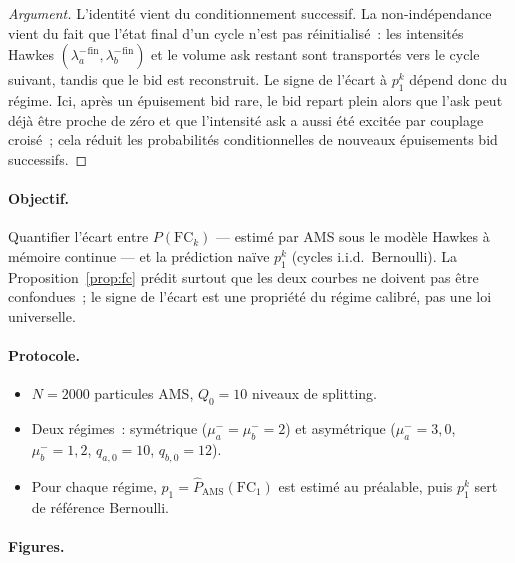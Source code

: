 \documentclass[11pt,a4paper]{article}
\theoremstyle{definition}
\newcommand{\la}{\lambda_a^-}
\newcommand{\lb}{\lambda_b^-}
\begin{document}
\begin{proof}[Argument]
L'identité vient du conditionnement successif. La non-indépendance vient du
fait que l'état final d'un cycle n'est pas réinitialisé~: les intensités
Hawkes $({\la}^\mathrm{fin},{\lb}^\mathrm{fin})$ et le volume ask restant sont
transportés vers le cycle suivant, tandis que le bid est reconstruit. Le signe
de l'écart à $p_1^k$ dépend donc du régime. Ici, après un épuisement bid rare,
le bid repart plein alors que l'ask peut déjà être proche de zéro et que
l'intensité ask a aussi été excitée par couplage croisé~; cela réduit les
probabilités conditionnelles de nouveaux épuisements bid successifs.
\end{proof}

\begin{demonstration}

\paragraph{Objectif.}
Quantifier l'écart entre $P(\mathrm{FC}_k)$ — estimé par AMS sous le modèle
Hawkes à mémoire continue — et la prédiction naïve $p_1^k$ (cycles i.i.d.\
Bernoulli). La Proposition~\ref{prop:fc} prédit surtout que les deux courbes
ne doivent pas être confondues~; le signe de l'écart est une propriété du
régime calibré, pas une loi universelle.

\paragraph{Protocole.}
\begin{itemize}
  \item $N=2000$ particules AMS, $Q_0=10$ niveaux de splitting.
  \item Deux régimes~: symétrique ($\mu_a^-=\mu_b^-=2$) et asymétrique
    ($\mu_a^-=3{,}0$, $\mu_b^-=1{,}2$, $q_{a,0}=10$, $q_{b,0}=12$).
  \item Pour chaque régime, $p_1=\hat P_\mathrm{AMS}(\mathrm{FC}_1)$
    est estimé au préalable, puis $p_1^k$ sert de référence Bernoulli.
\end{itemize}

\paragraph{Figures.}


\end{demonstration}
\end{document}

